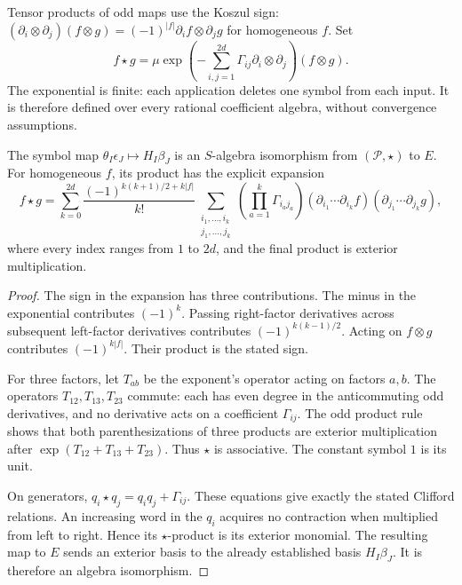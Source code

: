 Tensor products of odd maps use the Koszul sign:
\((\partial_i\otimes\partial_j)(f\otimes g)
 =(-1)^{|f|}\partial_i f\otimes\partial_jg\) for homogeneous \(f\).
Set
\begin{equation}\label{eq:co-symbol-star}
 f\star g=\mu\exp\left(-\sum_{i,j=1}^{2d}
                   \Gamma_{ij}\partial_i\otimes\partial_j\right)
                   (f\otimes g).
\end{equation}
The exponential is finite: each application deletes one symbol
from each input. It is therefore defined over every rational
coefficient algebra, without convergence assumptions.

\begin{proposition}\label{prop:co-symbol-product}
The symbol map \(\theta_I\epsilon_J\mapsto H_I\beta_J\) is an
\(S\)-algebra isomorphism from \((\mathcal P,\star)\) to \(E\).
For homogeneous \(f\), its product has the explicit expansion
\[
 f\star g=
 \sum_{k=0}^{2d}\frac{(-1)^{k(k+1)/2+k|f|}}{k!}
 \sum_{\substack{i_1,\ldots,i_k\\j_1,\ldots,j_k}}
 \left(\prod_{a=1}^k\Gamma_{i_aj_a}\right)
 (\partial_{i_1}\cdots\partial_{i_k}f)
 (\partial_{j_1}\cdots\partial_{j_k}g),
\]
where every index ranges from \(1\) to \(2d\), and the final
product is exterior multiplication.
\end{proposition}

\begin{proof}
The sign in the expansion has three contributions. The minus
in the exponential contributes \((-1)^k\). Passing right-factor
derivatives across subsequent left-factor derivatives contributes
\((-1)^{k(k-1)/2}\). Acting on \(f\otimes g\) contributes
\((-1)^{k|f|}\). Their product is the stated sign.

For three factors, let \(T_{ab}\) be the exponent's operator
acting on factors \(a,b\). The operators \(T_{12},T_{13},T_{23}\)
commute: each has even degree in the anticommuting odd derivatives,
and no derivative acts on a coefficient \(\Gamma_{ij}\).
The odd product rule shows that both parenthesizations of three
products are exterior multiplication after
\(\exp(T_{12}+T_{13}+T_{23})\). Thus \(\star\) is associative.
The constant symbol \(1\) is its unit.

On generators, \(q_i\star q_j=q_iq_j+\Gamma_{ij}\).
These equations give exactly the stated Clifford relations.
An increasing word in the \(q_i\) acquires no contraction when
multiplied from left to right. Hence its \(\star\)-product is
its exterior monomial. The resulting map to \(E\) sends an
exterior basis to the already established basis \(H_I\beta_J\).
It is therefore an algebra isomorphism.
\end{proof}

